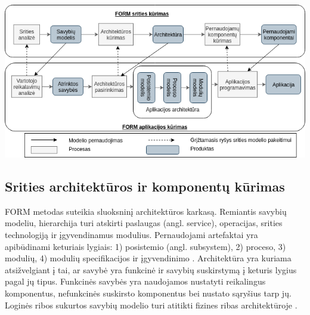\documentclass{VUMIFPSbakalaurinis}
\begin{document}


%



\begin{center}
    \includegraphics[scale=0.6]{img/form}
    \label{img:form}
\end{center}


\subsection{Srities architektūros ir komponentų kūrimas}

FORM metodas suteikia sluoksninį architektūros karkasą. Remiantis savybių modeliu, hierarchija turi atskirti paslaugas (angl. service), operacijas, srities technologiją ir įgyvendinamus modulius. Pernaudojami artefaktai yra apibūdinami keturiais lygiais: 1) posistemio (angl. subsystem), 2) proceso, 3) modulių, 4) modulių specifikacijos ir įgyvendinimo \cite{Kang1999}. Architektūra yra kuriama atsižvelgiant į tai, ar savybė yra funkcinė ir savybių suskirstymą į keturis lygius pagal jų tipus. Funkcinės savybės yra naudojamos nustatyti reikalingus komponentus, nefunkcinės suskirsto komponentus bei nustato sąryšius tarp jų. Loginės ribos sukurtos savybių modelio turi atitikti fizines ribas architektūroje \cite{Kang}.
\end{document}
